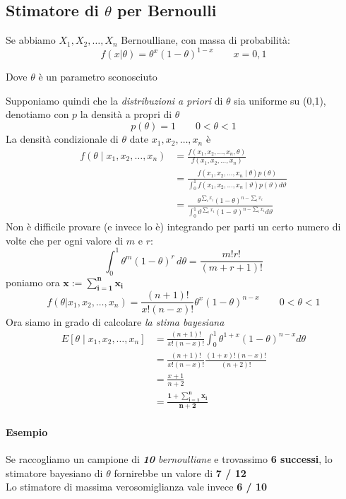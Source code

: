 \documentclass[]{article}
\begin{document}
    \subsection{Stimatore di $\theta$ per Bernoulli}
    Se abbiamo $X_1, X_2, \ldots, X_n$ Bernoulliane, con massa di probabilità:
    \[ f(x \rvert \theta) = \theta^x (1-\theta)^{1-x} \qquad x = 0,1 \]
    \centerline{Dove $\theta$ è un parametro sconosciuto}
    Supponiamo quindi che la \textit{distribuzioni a priori} di $\theta$ sia uniforme su (0,1), denotiamo con $p$ la densità a propri di $\theta$
    \[ p(\theta)=1 \qquad 0 < \theta < 1 \]
    La densità condizionale di $\theta$ date $x_1, x_2, \ldots, x_n$ è 
    \begin{equation}
        \begin{aligned}
        f\left(\theta \mid x_1, x_2, \ldots, x_n\right) & =\frac{f\left(x_1, x_2, \ldots, x_n, \theta\right)}{f\left(x_1, x_2, \ldots, x_n\right)} \\
        & =\frac{f\left(x_1, x_2, \ldots, x_n \mid \theta\right) p(\theta)}{\int_0^1 f\left(x_1, x_2, \ldots, x_n \mid \vartheta\right) p(\vartheta) d \vartheta} \\
        & =\frac{\theta^{\sum_i x_i}(1-\theta)^{n-\sum_i x_i}}{\int_0^1 \vartheta^{\sum_i x_i}(1-\vartheta)^{n-\sum_i x_i} d \vartheta}
        \end{aligned}
    \end{equation}
    Non è difficile provare (e invece lo è) integrando per parti un certo numero di volte che per ogni valore di $m$ e $r$:
    \[ \int_{0}^{1} \theta^m (1-\theta)^r \, d\theta = \frac{m! r!}{(m+r+1)!} \]
    poniamo ora $\boldsymbol{x := \sum_{i=1}^{n} x_i}$
    \[ f(\theta \rvert x_1, x_2, \ldots, x_n) = \frac{(n+1)!}{x! (n-x)!} \theta^x (1-\theta)^{n-x} \qquad 0 < \theta < 1 \]
    Ora siamo in grado di calcolare \textit{la stima bayesiana}
    \begin{equation}
        \begin{aligned}
        E\left[\theta \mid x_1, x_2, \ldots, x_n\right] & =\frac{(n+1) !}{x !(n-x) !} \int_0^1 \theta^{1+x}(1-\theta)^{n-x} d \theta \\
        &=\frac{(n+1) !}{x !(n-x) !} \frac{(1+x) !(n-x) !}{(n+2) !} \\
        &= \frac{x+1}{n+2} \\
        &= \boldsymbol{\frac{1 + \sum_{i=1}^{n} x_i}{n + 2}}
        \end{aligned}
    \end{equation}
    \paragraph{Esempio} Se raccogliamo un campione di \textit{\textbf{10} bernoulliane} e trovassimo \textbf{6 successi}, lo stimatore bayesiano di $\theta$ fornirebbe un valore di \textbf{7 / 12} \\
    Lo stimatore di massima verosomiglianza vale invece \textbf{6 / 10}
\end{document}
